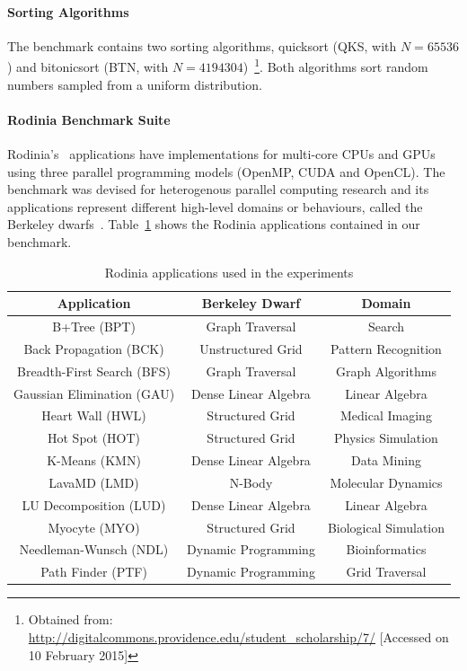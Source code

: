 \paragraph{Sorting Algorithms} The benchmark contains two sorting algorithms,
quicksort (QKS, with $N = 65536$) and bitonicsort (BTN, with $N =
4194304$)~\footnote{Obtained from:
\url{http://digitalcommons.providence.edu/student\_scholarship/7/} [Accessed on
10 February 2015]}.  Both algorithms sort random numbers sampled from a uniform
distribution.

\paragraph{Rodinia Benchmark Suite} Rodinia's~\cite{che2009rodinia}
applications have implementations for multi-core CPUs and GPUs using three
parallel programming models (OpenMP, CUDA and OpenCL). The benchmark was
devised for heterogenous parallel computing research and its applications
represent different high-level domains or behaviours, called the Berkeley
dwarfs~\cite{asanovic2006landscape, asanovic2009view}.
Table~\ref{tab:Rodinia} shows the Rodinia applications contained in our
benchmark.

\begin{table}[htpb]
    \centering
    \footnotesize
        \begin{tabular}{ccc}
            \toprule
            \textbf{Application} & \textbf{Berkeley Dwarf\cite{asanovic2009view}} & \textbf{Domain} \\\midrule
            B+Tree (BPT) & Graph Traversal& Search \\\midrule
            Back Propagation (BCK) & Unstructured Grid & Pattern Recognition \\\midrule
            Breadth-First Search (BFS) & Graph Traversal & Graph Algorithms \\\midrule
            Gaussian Elimination (GAU) & Dense Linear Algebra & Linear Algebra \\\midrule
            Heart Wall (HWL) & Structured Grid & Medical Imaging \\\midrule
            Hot Spot (HOT) & Structured Grid & Physics Simulation \\\midrule
            K-Means (KMN) & Dense Linear Algebra & Data Mining \\\midrule
            LavaMD (LMD) & N-Body & Molecular Dynamics \\\midrule
            LU Decomposition (LUD) & Dense Linear Algebra & Linear Algebra \\\midrule
            Myocyte (MYO) & Structured Grid & Biological Simulation \\\midrule
            Needleman-Wunsch (NDL) & Dynamic Programming & Bioinformatics \\\midrule
            Path Finder (PTF) & Dynamic Programming & Grid Traversal \\\bottomrule
        \end{tabular}
    \caption{Rodinia applications used in the experiments}
    \label{tab:Rodinia}
\end{table}

